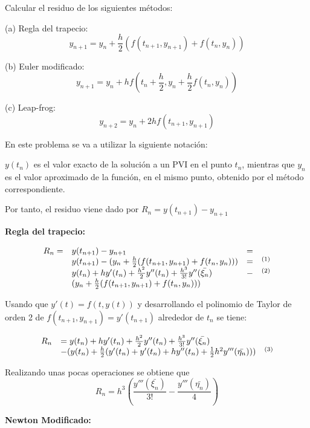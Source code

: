 \begin{mathproblem}{4}
Calcular el residuo de los siguientes métodos:

(a) Regla del trapecio:
$$y_{n+1}=y_n+\frac{h}{2}(f(t_{n+1},y_{n+1})+f(t_n, y_n))$$

(b) Euler modificado:
$$y_{n+1}=y_n+hf(t_n+\frac{h}{2}, y_n+\frac{h}{2}f(t_n, y_n))$$

(c) Leap-frog:
$$y_{n+2} = y_n + 2hf(t_{n+1}, y_{n+1})$$
\end{mathproblem}
En este problema se va a utilizar la siguiente notación: 

$y(t_n)$ es el valor exacto de la solución a un PVI en el punto $t_n$, mientras que $y_n$ es el valor aproximado de la función, en el mismo punto, obtenido por el método correspondiente. 

Por tanto, el residuo viene dado por $R_n = y(t_{n+1}) - y_{n+1}$

\vspace{5mm}
\noindent\textbf{Regla del trapecio:}

\begin{equation*}
\begin{array}{l l l l}
R_n = & y(t_{n+1}) - y_{n+1} & = \\
 & y(t_{n+1}) - (y_n+\frac{h}{2}(f(t_{n+1},y_{n+1})+f(t_n, y_n))) & = & ^{(1)}\\
 & y(t_n)+hy'(t_n)+\frac{h^2}{2}y''(t_n)+\frac{h^3}{3!}y''(\bar{\xi_n}) & - & ^{(2)}\\ 
 & (y_n+\frac{h}{2}(f(t_{n+1},y_{n+1})+f(t_n, y_n))) & &  
\end{array}
\end{equation*}

Usando que $y'(t) = f(t, y(t))$ y desarrollando el polinomio de Taylor de orden 2 de $f(t_{n+1}, y_{n+1}) = y'(t_{n+1})$ alrededor de $t_n$ se tiene:

\begin{equation*}
\begin{array}{l l l}
R_n & = y(t_n)+hy'(t_n)+\frac{h^2}{2}y''(t_n)+\frac{h^3}{3!}y''(\bar{\xi_n}) &  \\
	& - (y(t_n) + \frac{h}{2}(y'(t_n) + y'(t_n) + hy''(t_n) + \frac{1}{2}h^2y'''(\bar{\eta_n}))) & ^{(3)}
\end{array}
\end{equation*}

Realizando unas pocas operaciones se obtiene que
$$R_n = h^3\left(\frac{y'''(\bar{\xi_n})}{3!} - \frac{y'''(\bar{\eta_n})}{4}\right)$$


\vspace{5mm}
\noindent\textbf{Newton Modificado:}

\color{red}{En proceso}

